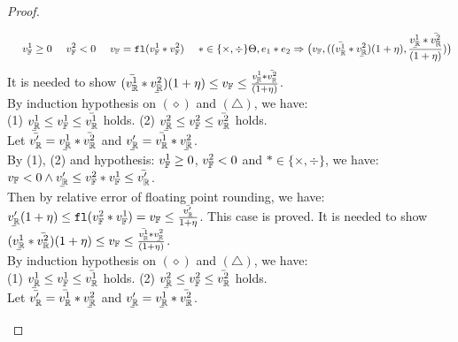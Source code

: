 \documentclass[a4paper,11pt]{article}
\begin{document}
\begin{proof}
\begin{itemize}
{\[{			~~~~
			\fval^1 \geq 0
			~~~~
			\fval^2 < 0
			~~~~
			\fval = \floaten(\fval^1 * \fval^2)
			~~~~
			* \in \{\times, \div \}
		}
		{
		    \trsenv, \expr_1 * \expr_2
		    \trsto
		    \big(
		    \fval,
		    ((\bar{\rval^1} * \ubar{\rval^2})(1 + \eta),
		    \frac{\ubar{\rval^1} * \bar{\rval^2}}{(1 + \eta)})
		    \big)
		}
	\]}
	It is needed to show 
	$(\bar{\rval^1} * \ubar{\rval^2})(1 + \eta)
	\leq \fval \leq 
	\frac{\ubar{\rval^1} * \bar{\rval^2}}{(1 + \eta)}$.\\
	By induction hypothesis on $(\diamond)$ and $(\triangle)$, we have:\\
	(1) $\ubar{\rval^1} \leq \fval^1 \leq \bar{\rval^1}$ holds. 
	(2) $\ubar{\rval^2} \leq \fval^2 \leq \bar{\rval^2}$ holds.\\
	Let $\bar{\rval'} = 
	\ubar{\rval^1} * \bar{\rval^2}$
	and 
	$\ubar{\rval'} = \bar{\rval^1} * \ubar{\rval^2}$.
	\\
	By (1), (2) and hypothesis: $v_{\mathbb{F}}^1 \geq 0$, $v_{\mathbb{F}}^2 < 0$ and $ * \in \{\times, \div\}$, we have:
	$\fval < 0
	\land
	\ubar{\rval'}
	\leq \fval^2 \bop \fval^1
	\leq \bar{\rval'}$.\\
	Then by relative error of floating point rounding, we have:\\
	$\ubar{\rval'}(1 + \eta)
	\leq \floaten(\fval^2 \bop \fval^1) = \fval
	\leq \frac{\bar{\rval'}}{1 + \eta}$.
	This case is proved.
	\caseL{\[
	\inferrule*[right = bop-np]
		{
			\trsenv, \expr_1 \trsto (\fval^1, (\ubar{\rval^1}, \bar{\rval^1}))
			~~~~
			\trsenv, \expr_2 \trsto (\fval^2, (\ubar{\rval^2}, \bar{\rval^2}))
			~~~~
			\fval^1 < 0
			~~~~
			\fval^2 \geq 0
			~~~~
			\fval = \floaten(\fval^1 * \fval^2)
			~~~~
			* \in \{\times, \div \}
		}
		{
		    \trsenv, \expr_1 * \expr_2
		    \trsto
		    \big(
		    \fval,
		    ((\ubar{\rval^1} * \bar{\rval^2})(1 + \eta),
		    \frac{\bar{\rval^1} * \ubar{\rval^2}}{(1 + \eta)})
		    \big)
		}
	\]}
 	It is needed to show 
	$(\ubar{\rval^1} * \bar{\rval^2})(1 + \eta)
	\leq \fval \leq 
	\frac{\bar{\rval^1} * \ubar{\rval^2}}{(1 + \eta)}$.\\
	By induction hypothesis on $(\diamond)$ and $(\triangle)$, we have:\\
	(1) $\ubar{\rval^1} \leq \fval^1 \leq \bar{\rval^1}$ holds. 
	(2) $\ubar{\rval^2} \leq \fval^2 \leq \bar{\rval^2}$ holds.\\
	Let 
	$\bar{\rval'} = \bar{\rval^1} * \ubar{\rval^2}$
	and 
	$\ubar{\rval'} = \ubar{\rval^1} * \bar{\rval^2}$.
	\\

\end{itemize}
\end{proof}
\end{document}
